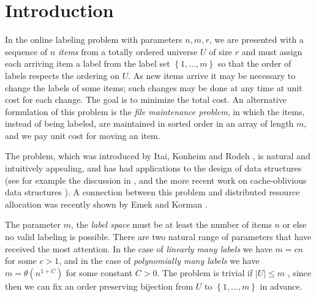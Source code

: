 \documentclass[unicode,review]{siamart1116}
\newcommand{\natInt}[2]{ \left\{ #1, \dotsc, #2 \right\} }
\numberwithin{theorem}{section}
\begin{document}
\section{Introduction}

In the online labeling problem with parameters $n,m,r$,
we are presented with a sequence of $n$ {\em items} from a totally ordered universe $U$ of size $r$
and must assign each arriving item a label from the label set $\natInt{1}{m}$ so that the order of labels respects the ordering on $U$.
As new items arrive it may be necessary to change the labels of some items; such changes may be done at any time at unit cost
for each change.
The goal is to minimize
the total cost.
An alternative formulation of this problem is
the \emph{file maintenance problem}, in which the items, instead of being labeled,
are maintained in sorted order in an  array of length $m$, and we pay unit cost for moving an item.
\iffalse
In this formulation we allow cells of the array to contain a special value that marks unoccupied array cells, and we are
concerned only about the total number of moves of actual items stored in the array.
\fi

The problem, which was introduced by Itai, Konheim and Rodeh \cite{Itaietal},
is natural and intuitively appealing, and has had applications to the design of data structures (see for example
the discussion in \cite{DSZ04}, and the more recent work on cache-oblivious data structures
\cite{BenderetalB-Tree,Brodaletal,BDIW}).  A connection between this problem and distributed resource allocation
was recently shown by Emek and Korman \cite{EK11}.


The parameter $m$, the {\em label space} must be at least the number of items $n$ or else no valid labeling is possible.
There are two natural range of parameters that have received the most attention. In the case of {\em linearly many labels} we have
$m=cn$ for some $c>1$, and in the case of {\em polynomially many labels} we have $m=\theta(n^{1+C})$ for some constant $C>0$.
The problem is trivial if  $|U| \leq m$ , since then we can fix an order preserving
bijection from $U$ to $\natInt{1}{m}$ in advance.   
\iffalse The known upper bounds for this problem, summarized in the next paragraph, put no restriction on the size of $U$.  For the lower bound proved in this paper we will assume that  $|U|$
has size at least exponential in $n$.
\fi

\end{document}
